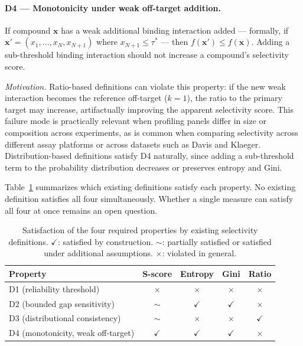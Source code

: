\documentclass[journal=jcisd8,manuscript=article]{achemso}
\begin{document}
\paragraph{D4 --- Monotonicity under weak off-target addition.}
If compound $\mathbf{x}$ has a weak additional binding interaction added ---
formally, if $\mathbf{x}' = (x_1, \ldots, x_N, x_{N+1})$ where $x_{N+1} \leq
\tau^*$ --- then $f(\mathbf{x}') \leq f(\mathbf{x})$.
Adding a sub-threshold binding interaction should not increase a compound's
selectivity score.

\textit{Motivation.}
Ratio-based definitions can violate this property: if the new weak interaction
becomes the reference off-target ($k=1$), the ratio to the primary target may
increase, artifactually improving the apparent selectivity score.
This failure mode is practically relevant when profiling panels differ in size
or composition across experiments, as is common when comparing selectivity
across different assay platforms or across datasets such as Davis and Klaeger.
Distribution-based definitions satisfy D4 naturally, since adding a
sub-threshold term to the probability distribution decreases or preserves
entropy and Gini.

\bigskip
Table~\ref{tab:desiderata} summarizes which existing definitions satisfy each
property.
No existing definition satisfies all four simultaneously.
Whether a single measure can satisfy all four at once remains an open question.

\begin{table}[h]
  \centering
  \caption{Satisfaction of the four required properties by existing
           selectivity definitions.
           $\checkmark$: satisfied by construction.
           $\sim$: partially satisfied or satisfied under additional assumptions.
           $\times$: violated in general.}
  \label{tab:desiderata}
  \begin{tabular}{lcccc}
    \toprule
    Property & S-score & Entropy & Gini & Ratio \\
    \midrule
    D1 (reliability threshold)        & $\times$ & $\times$ & $\times$ & $\times$ \\
    D2 (bounded gap sensitivity)      & $\sim$   & $\checkmark$ & $\checkmark$ & $\times$ \\
    D3 (distributional consistency)   & $\sim$   & $\times$ & $\times$ & $\checkmark$ \\
    D4 (monotonicity, weak off-target)& $\checkmark$ & $\checkmark$ & $\checkmark$ & $\times$ \\
    \bottomrule
  \end{tabular}
\end{table}
\end{document}
